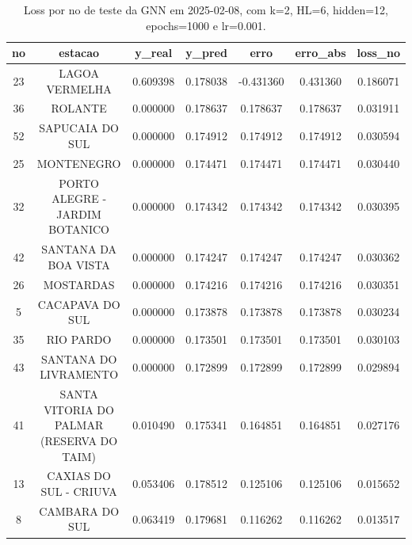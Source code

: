 \begin{table}[h]
\centering
\caption{Loss por no de teste da GNN em 2025-02-08, com k=2, HL=6, hidden=12, epochs=1000 e lr=0.001.}
\label{tab:gnn_loss_k2_hl6_h12_e1000_d20250208}
\begin{tabular}{ccccccc}
\toprule
no & estacao & y\_real & y\_pred & erro & erro\_abs & loss\_no \\
\midrule
23 & LAGOA VERMELHA & 0.609398 & 0.178038 & -0.431360 & 0.431360 & 0.186071 \\
36 & ROLANTE & 0.000000 & 0.178637 & 0.178637 & 0.178637 & 0.031911 \\
52 & SAPUCAIA DO SUL & 0.000000 & 0.174912 & 0.174912 & 0.174912 & 0.030594 \\
25 & MONTENEGRO & 0.000000 & 0.174471 & 0.174471 & 0.174471 & 0.030440 \\
32 & PORTO ALEGRE - JARDIM BOTANICO & 0.000000 & 0.174342 & 0.174342 & 0.174342 & 0.030395 \\
42 & SANTANA DA BOA VISTA & 0.000000 & 0.174247 & 0.174247 & 0.174247 & 0.030362 \\
26 & MOSTARDAS & 0.000000 & 0.174216 & 0.174216 & 0.174216 & 0.030351 \\
5 & CACAPAVA DO SUL & 0.000000 & 0.173878 & 0.173878 & 0.173878 & 0.030234 \\
35 & RIO PARDO & 0.000000 & 0.173501 & 0.173501 & 0.173501 & 0.030103 \\
43 & SANTANA DO LIVRAMENTO & 0.000000 & 0.172899 & 0.172899 & 0.172899 & 0.029894 \\
41 & SANTA VITORIA DO PALMAR (RESERVA DO TAIM) & 0.010490 & 0.175341 & 0.164851 & 0.164851 & 0.027176 \\
13 & CAXIAS DO SUL - CRIUVA & 0.053406 & 0.178512 & 0.125106 & 0.125106 & 0.015652 \\
8 & CAMBARA DO SUL & 0.063419 & 0.179681 & 0.116262 & 0.116262 & 0.013517 \\
\bottomrule
\end{tabular}
\end{table}

